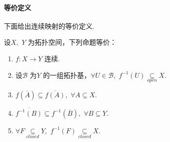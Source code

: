 \paragraph{等价定义}
	下面给出连续映射的等价定义.
	\begin{proposition}\label{prop 1.2.1}
		设$X , \,\, Y$ 为拓扑空间，下列命题等价：
		\begin{enumerate}
			\item $f : X \longrightarrow Y$ 连续.
			
			\item 设$\mathcal{B}$ 为$Y$ 的一组拓扑基，$\forall U \in \mathcal{B} , \,\, f^{-1}(U) \underset{open}{\subseteq} X$.
			
			\item $f(\overline{A}) \subseteq \overline{f(A)} , \,\, \forall A \subseteq X$.
			
			\item $\overline{f^{-1}(B)} \subseteq f^{-1}(\overline{B}) , \,\, \forall B \subseteq Y$.
			
			\item $\forall F \underset{closed}{\subseteq} Y , \,\, f^{-1}(F) \underset{closed}{\subseteq} X$.
		\end{enumerate}
	\end{proposition}
